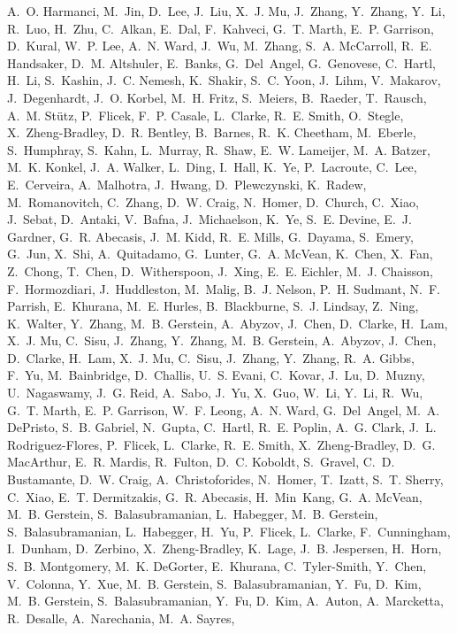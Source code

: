 \documentclass[webpdf,contemporary,large,single]{oup-authoring-template}%
\theoremstyle{thmstyleone}%
\theoremstyle{thmstyletwo}%
\theoremstyle{thmstylethree}%
\begin{document}
\begin{thebibliography}{10}
  A.~O. Harmanci, M.~Jin, D.~Lee, J.~Liu, X.~J. Mu, J.~Zhang, Y.~Zhang, Y.~Li,
  R.~Luo, H.~Zhu, C.~Alkan, E.~Dal, F.~Kahveci, G.~T. Marth, E.~P. Garrison,
  D.~Kural, W.~P. Lee, A.~N. Ward, J.~Wu, M.~Zhang, S.~A. McCarroll, R.~E.
  Handsaker, D.~M. Altshuler, E.~Banks, G.~Del~Angel, G.~Genovese, C.~Hartl,
  H.~Li, S.~Kashin, J.~C. Nemesh, K.~Shakir, S.~C. Yoon, J.~Lihm, V.~Makarov,
  J.~Degenhardt, J.~O. Korbel, M.~H. Fritz, S.~Meiers, B.~Raeder, T.~Rausch,
  A.~M. Stütz, P.~Flicek, F.~P. Casale, L.~Clarke, R.~E. Smith, O.~Stegle,
  X.~Zheng-Bradley, D.~R. Bentley, B.~Barnes, R.~K. Cheetham, M.~Eberle,
  S.~Humphray, S.~Kahn, L.~Murray, R.~Shaw, E.~W. Lameijer, M.~A. Batzer, M.~K.
  Konkel, J.~A. Walker, L.~Ding, I.~Hall, K.~Ye, P.~Lacroute, C.~Lee,
  E.~Cerveira, A.~Malhotra, J.~Hwang, D.~Plewczynski, K.~Radew, M.~Romanovitch,
  C.~Zhang, D.~W. Craig, N.~Homer, D.~Church, C.~Xiao, J.~Sebat, D.~Antaki,
  V.~Bafna, J.~Michaelson, K.~Ye, S.~E. Devine, E.~J. Gardner, G.~R. Abecasis,
  J.~M. Kidd, R.~E. Mills, G.~Dayama, S.~Emery, G.~Jun, X.~Shi, A.~Quitadamo,
  G.~Lunter, G.~A. McVean, K.~Chen, X.~Fan, Z.~Chong, T.~Chen, D.~Witherspoon,
  J.~Xing, E.~E. Eichler, M.~J. Chaisson, F.~Hormozdiari, J.~Huddleston,
  M.~Malig, B.~J. Nelson, P.~H. Sudmant, N.~F. Parrish, E.~Khurana, M.~E.
  Hurles, B.~Blackburne, S.~J. Lindsay, Z.~Ning, K.~Walter, Y.~Zhang, M.~B.
  Gerstein, A.~Abyzov, J.~Chen, D.~Clarke, H.~Lam, X.~J. Mu, C.~Sisu, J.~Zhang,
  Y.~Zhang, M.~B. Gerstein, A.~Abyzov, J.~Chen, D.~Clarke, H.~Lam, X.~J. Mu,
  C.~Sisu, J.~Zhang, Y.~Zhang, R.~A. Gibbs, F.~Yu, M.~Bainbridge, D.~Challis,
  U.~S. Evani, C.~Kovar, J.~Lu, D.~Muzny, U.~Nagaswamy, J.~G. Reid, A.~Sabo,
  J.~Yu, X.~Guo, W.~Li, Y.~Li, R.~Wu, G.~T. Marth, E.~P. Garrison, W.~F. Leong,
  A.~N. Ward, G.~Del~Angel, M.~A. DePristo, S.~B. Gabriel, N.~Gupta, C.~Hartl,
  R.~E. Poplin, A.~G. Clark, J.~L. Rodriguez-Flores, P.~Flicek, L.~Clarke,
  R.~E. Smith, X.~Zheng-Bradley, D.~G. MacArthur, E.~R. Mardis, R.~Fulton,
  D.~C. Koboldt, S.~Gravel, C.~D. Bustamante, D.~W. Craig, A.~Christoforides,
  N.~Homer, T.~Izatt, S.~T. Sherry, C.~Xiao, E.~T. Dermitzakis, G.~R. Abecasis,
  H.~Min~Kang, G.~A. McVean, M.~B. Gerstein, S.~Balasubramanian, L.~Habegger,
  M.~B. Gerstein, S.~Balasubramanian, L.~Habegger, H.~Yu, P.~Flicek, L.~Clarke,
  F.~Cunningham, I.~Dunham, D.~Zerbino, X.~Zheng-Bradley, K.~Lage, J.~B.
  Jespersen, H.~Horn, S.~B. Montgomery, M.~K. DeGorter, E.~Khurana,
  C.~Tyler-Smith, Y.~Chen, V.~Colonna, Y.~Xue, M.~B. Gerstein,
  S.~Balasubramanian, Y.~Fu, D.~Kim, M.~B. Gerstein, S.~Balasubramanian, Y.~Fu,
  D.~Kim, A.~Auton, A.~Marcketta, R.~Desalle, A.~Narechania, M.~A. Sayres,

\end{thebibliography}
\end{document}
